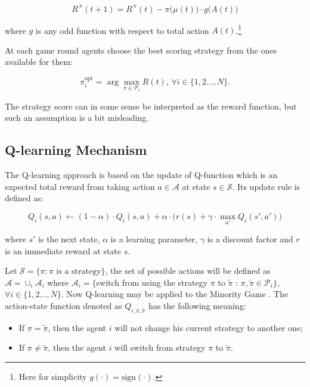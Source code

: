 \documentclass[12pt,american,czech]{article}
\begin{document}
\begin{equation} \label{eq:mg_score_upd}
R^{\,\pi}(t+1) = R^{\,\pi}(t)-\pi\big(\mu(t)\big)\cdot g\big(A(t)\big)
\end{equation}

\noindent
where $g$ is any odd function with respect to total action $A(t)$.\footnote{Here for simplicity $g(\cdot)=\text{sign}(\cdot)$.} 

\medskip

At each game round agents choose the best scoring strategy from the ones available for them:

\begin{equation}
\pi_{i}^{\text{opt}} = \arg \max_{\pi\in\mathcal{P}_{i}} R(t),\,\forall i\in\{1,2\dots,N\}.
\end{equation}

The strategy score can in some sense be interpreted as the reward function, but such an assumption is a bit misleading. 

\subsection{Q-learning Mechanism}\label{subsec:q}

The Q-learning approach is based on the update of Q-function which is an expected total reward from taking action $a\in\mathcal{A}$ at state $s\in\mathcal{S}$. Its update rule is defined as:

\begin{equation}
Q_{i}(s,a)\leftarrow(1-\alpha)\cdot Q_{i}(s,a)+\alpha\cdot\big(r(s)+\gamma\cdot\max_{a'}Q_{i}(s',a')\big)
\end{equation}

\noindent
where $s'$ is the next state, $\alpha$ is a learning parameter, $\gamma$ is a discount factor and $r$ is an immediate reward at state $s$.

Let $\mathcal{S}=\{\pi: \pi \text{ is a strategy}\}$, the set of possible actions will be defined as $\mathcal{A}=\cup_{i}\mathcal{A}_i$ where $\mathcal{A}_i=\{$switch from using the strategy $\pi$ to $\tilde{\pi}$ : $\pi,\tilde{\pi}\in\mathcal{P}_{i}\}$, $\forall i\in\{1,2\dots,N\}$. Now Q-learning may be applied to the Minority Game \cite{ANDRECUT2002}. The action-state function denoted as $Q_{i,\pi,\tilde{\pi}}$ has the following meaning:

\begin{itemize}
\item If $\pi=\tilde{\pi}$, then the agent $i$ will not change his current strategy to another one;
\item If $\pi\neq\tilde{\pi}$, then the agent $i$ will switch from strategy $\pi$ to $\tilde{\pi}$.
\end{itemize}
\end{document}
